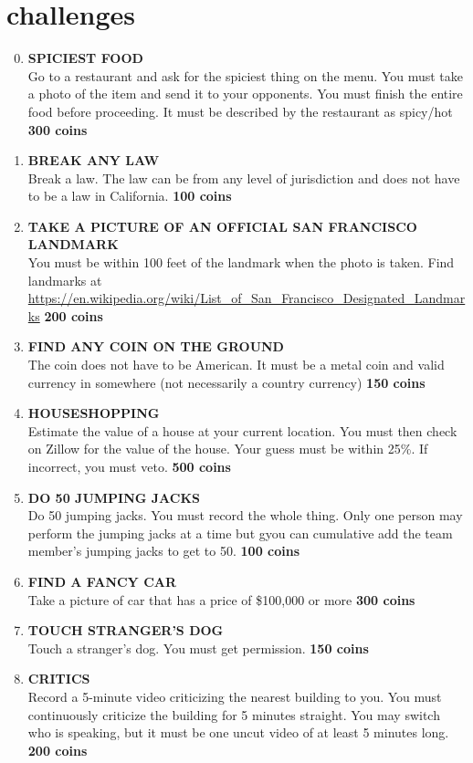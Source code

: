 \documentclass{article}
\begin{document}
\section{challenges}
\begin{enumerate}
    \setcounter{enumi}{-1}
    \item \textbf{SPICIEST FOOD} \\ Go to a restaurant and ask for the spiciest thing on the menu. You must take a photo of the item and send it to your opponents. You must finish the entire food before proceeding. It must be described by the restaurant as spicy/hot  \textbf{300 coins}
    \item \textbf{BREAK ANY LAW} \\ Break a law. The law can be from any level of jurisdiction and does not have to be a law in California. \textbf{100 coins}
    \item \textbf{TAKE A PICTURE OF AN OFFICIAL SAN FRANCISCO LANDMARK} \\ You must be within 100 feet of the landmark when the photo is taken. Find landmarks at \url{https://en.wikipedia.org/wiki/List_of_San_Francisco_Designated_Landmarks} \textbf{200 coins}
    \item \textbf{FIND ANY COIN ON THE GROUND} \\ The coin does not have to be American. It must be a metal coin and valid currency in somewhere (not necessarily a country currency) \textbf{150 coins}
    \item \textbf{HOUSESHOPPING}\\ Estimate the value of a house at your current location. You must then check on Zillow for the value of the house. Your guess must be within 25\%. If incorrect, you must veto. \textbf{500 coins}
    \item \textbf{DO 50 JUMPING JACKS} \\ Do 50 jumping jacks. You must record the whole thing. Only one person may perform the jumping jacks at a time but gyou can cumulative add the team member's jumping jacks to get to 50. \textbf{100 coins}
    \item \textbf{FIND A FANCY CAR} \\ Take a picture of car that has a price of \$100,000 or more \textbf{300 coins}
    \item \textbf{TOUCH STRANGER'S DOG} \\ Touch a stranger's dog. You must get permission. \textbf{150 coins}
    \item \textbf{CRITICS} \\ Record a 5-minute video criticizing the nearest building to you. You must continuously criticize the building for 5 minutes straight. You may switch who is speaking, but it must be one uncut video of at least 5 minutes long. \textbf{200 coins}

\end{enumerate}
\end{document}
